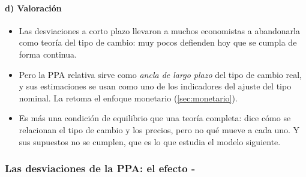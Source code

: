 \documentclass[11pt]{article}
\begin{document}
\paragraph{d) Valoración}
\begin{itemize}
\item Las desviaciones a corto plazo llevaron a muchos economistas a abandonarla como teoría del tipo de cambio: muy pocos defienden hoy que se cumpla de forma continua.
\item Pero la PPA relativa sirve como \emph{ancla de largo plazo} del tipo de cambio real, y sus estimaciones se usan como uno de los indicadores del ajuste del tipo nominal. La retoma el enfoque monetario (\ref{sec:monetario}).
\item Es más una condición de equilibrio que una teoría completa: dice cómo se relacionan el tipo de cambio y los precios, pero no qué mueve a cada uno. Y sus supuestos no se cumplen, que es lo que estudia el modelo siguiente.
\end{itemize}

\subsubsection{Las desviaciones de la PPA: el efecto -}\label{sec:balassa-samuelson}
\end{document}
